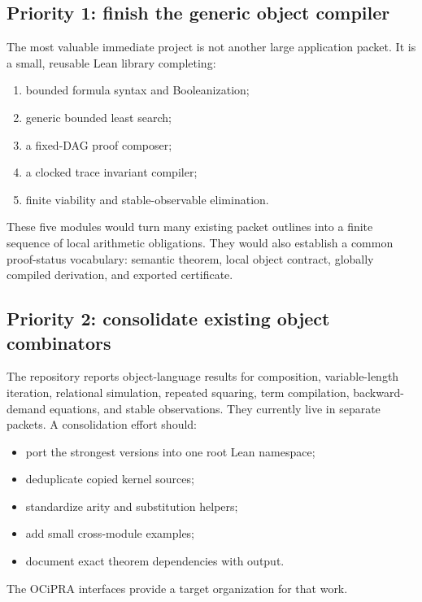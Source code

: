 \subsection{Priority 1: finish the generic object compiler}

The most valuable immediate project is not another large application packet.  It is a small, reusable Lean library completing:

\begin{enumerate}
  \item bounded formula syntax and Booleanization;
  \item generic bounded least search;
  \item a fixed-DAG proof composer;
  \item a clocked trace invariant compiler;
  \item finite viability and stable-observable elimination.
\end{enumerate}

These five modules would turn many existing packet outlines into a finite sequence of local arithmetic obligations.  They would also establish a common proof-status vocabulary: semantic theorem, local object contract, globally compiled derivation, and exported certificate.

\subsection{Priority 2: consolidate existing object combinators}

The repository reports object-language results for composition, variable-length iteration, relational simulation, repeated squaring, term compilation, backward-demand equations, and stable observations.  They currently live in separate packets.  A consolidation effort should:

\begin{itemize}
  \item port the strongest versions into one root Lean namespace;
  \item deduplicate copied kernel sources;
  \item standardize arity and substitution helpers;
  \item add small cross-module examples;
  \item document exact theorem dependencies with  output.
\end{itemize}

The OCiPRA interfaces provide a target organization for that work.

